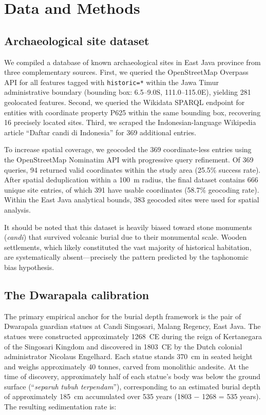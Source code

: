 \documentclass[12pt,a4paper]{article}
\begin{document}
\section{Data and Methods}

\subsection{Archaeological site dataset}

We compiled a database of known archaeological sites in East Java province from three complementary sources. First, we queried the OpenStreetMap Overpass API for all features tagged with \texttt{historic=*} within the Jawa Timur administrative boundary (bounding box: 6.5--9.0\textdegree{}S, 111.0--115.0\textdegree{}E), yielding 281 geolocated features. Second, we queried the Wikidata SPARQL endpoint for entities with coordinate property P625 within the same bounding box, recovering 16 precisely located sites. Third, we scraped the Indonesian-language Wikipedia article ``Daftar candi di Indonesia'' for 369 additional entries.

To increase spatial coverage, we geocoded the 369 coordinate-less entries using the OpenStreetMap Nominatim API with progressive query refinement. Of 369 queries, 94 returned valid coordinates within the study area (25.5\% success rate). After spatial deduplication within a 100~m radius, the final dataset contains 666 unique site entries, of which 391 have usable coordinates (58.7\% geocoding rate). Within the East Java analytical bounds, 383 geocoded sites were used for spatial analysis.

It should be noted that this dataset is heavily biased toward stone monuments (\textit{candi}) that survived volcanic burial due to their monumental scale. Wooden settlements, which likely constituted the vast majority of historical habitation, are systematically absent---precisely the pattern predicted by the taphonomic bias hypothesis.

\subsection{The Dwarapala calibration}

The primary empirical anchor for the burial depth framework is the pair of Dwarapala guardian statues at Candi Singosari, Malang Regency, East Java. The statues were constructed approximately 1268~CE during the reign of Kertanegara of the Singosari Kingdom and discovered in 1803~CE by the Dutch colonial administrator Nicolaus Engelhard. Each statue stands 370~cm in seated height and weighs approximately 40 tonnes, carved from monolithic andesite. At the time of discovery, approximately half of each statue's body was below the ground surface (``\textit{separuh tubuh terpendam}''), corresponding to an estimated burial depth of approximately 185~cm accumulated over 535 years (1803 $-$ 1268 = 535 years). The resulting sedimentation rate is:
\end{document}

